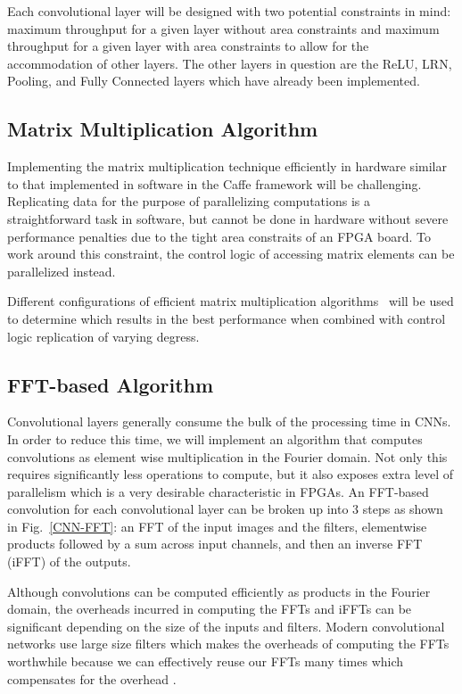 \documentclass[conference,compsoc]{IEEEtran/IEEEtran}
\begin{document}
Each convolutional layer will be designed with two potential constraints in mind: 
maximum throughput for a given layer without area constraints and maximum throughput
for a given layer with area constraints to allow for the accommodation of other 
layers. The other layers in question are the ReLU, LRN, Pooling, and Fully Connected
layers which have already been implemented. 

\subsection{Matrix Multiplication Algorithm}
Implementing the matrix multiplication technique efficiently in hardware similar to that implemented in software in the Caffe framework will be challenging.
Replicating data for the purpose of parallelizing computations is a straightforward task in software, but cannot be done in hardware without severe performance penalties due to the tight area constraits of an FPGA board.
To work around this constraint, the control logic of accessing matrix elements can be parallelized instead.

Different configurations of efficient matrix multiplication algorithms~\cite{MM_strassen,MM_efficient} will be used to determine which results in the best performance when combined with control logic replication of varying degress.

\subsection{FFT-based Algorithm}
Convolutional layers generally consume the bulk of the processing time in CNNs. In order to reduce this time, we will implement an algorithm that computes convolutions as element wise multiplication in the Fourier domain. Not only this requires significantly less operations to compute, but it also exposes extra level of parallelism which is a very desirable characteristic in FPGAs. An FFT-based convolution for each convolutional layer can be broken up into $3$ steps as shown in Fig.~\ref{CNN-FFT}: an FFT of the input images and the filters, elementwise products followed by a sum across input channels, and then an inverse FFT (iFFT) of the outputs.

Although convolutions can be computed efficiently as products in the Fourier domain, the overheads incurred in computing the FFTs and iFFTs can be significant depending on the size of the inputs and filters. Modern convolutional networks use large size filters which makes the overheads of computing the FFTs worthwhile because we can effectively reuse our FFTs many times which compensates for the overhead \cite{FFT1}.
\end{document}
